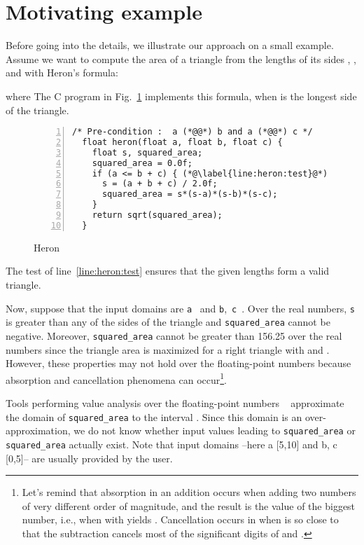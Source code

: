 \documentclass[a4paper]{llncs}
\newcommand{\ie}{i.e.}
\begin{document}
\section{Motivating example}

Before going into the details, we illustrate our approach on a small
example. Assume we want to compute the area of a triangle from the
lengths of its sides , , and  with Heron's formula:

where 
The C program in Fig.~\ref{lst:heron} implements this formula, when
 is the longest side of the triangle.
\begin{figure}[t] \begin{lstlisting}[numbers=left, numbersep=-1em,numberstyle=\tiny]
  /* Pre-condition :  a (*@@*) b and a (*@@*) c */
  float heron(float a, float b, float c) { 
    float s, squared_area;
    squared_area = 0.0f;
    if (a <= b + c) { (*@\label{line:heron:test}@*)
      s = (a + b + c) / 2.0f;
      squared_area = s*(s-a)*(s-b)*(s-c);
    }
    return sqrt(squared_area);
  }
\end{lstlisting}
\caption{Heron}
\label{lst:heron}
\end{figure}


The test of line~\ref{line:heron:test} ensures that the given lengths form
a valid triangle. 

Now, suppose that the input domains are \mbox{\lstinline|a| } and \mbox{\lstinline|b|, \lstinline|c| }. Over the real numbers, \lstinline|s| is greater
than any of the sides of the triangle and \lstinline|squared_area|
cannot be negative. Moreover, \lstinline|squared_area| cannot be
greater than 156.25 over the real numbers since the triangle area is
maximized for a right triangle with  and .
However, these properties may not hold over the floating-point numbers
because absorption and cancellation phenomena can occur\footnote{Let's remind that absorption in an addition occurs when  adding
two numbers of very different order of magnitude, and the result is the
value of the biggest number, \ie{}, when  with  yields . 
Cancellation occurs in  when  is so
  close to  that the subtraction cancels most of the significant
  digits of  and .}.

Tools performing value analysis over the floating-point numbers
~\cite{delmasGoubaultPutotSouyrisTekkalVedrine09,ponsiniMichelRueher12}
approximate the domain of \lstinline|squared_area| to the interval
. Since this domain is an
over-approximation, we do not know whether input values leading to
\lstinline|squared_area|  or \lstinline|squared_area| 
actually exist. Note that input domains --here a  [5,10] and b, c  [0,5]-- are usually provided by the user. 
\end{document}
